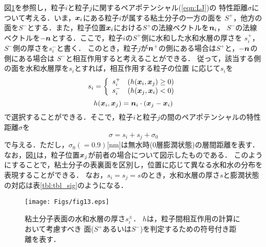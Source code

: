 図\ref{fig:fig13}を参照し，粒子$i$と粒子$j$に関するペアポテンシャル(\ref{eqn:LJ})の
特性距離$\sigma$について考える．いま，$\mbox{\boldmath $x$}_i$にある粒子$i$が属する粘土分子の一方の面を
$S^+$，他方の面を$S^-$とする．また，粒子位置$\mbox{\boldmath $x$}_i$における$S^+$の法線ベクトルを$\mbox{\boldmath $n$}_i$，
$S^-$の法線ベクトルを$-\mbox{\boldmath $n$}$とする．ここで，粒子$i$の$S^+$側に水和した水和水層の厚さを
$s_i^+$，$S^-$側の厚さを$s_i^-$と書く．
このとき，粒子$j$が$\mbox{\boldmath $n$}^+$の側にある場合は$S^+$と，$-\mbox{\boldmath $n$}$の側にある場合は
$S^-$と相互作用すると考えることができる．
従って，該当する側の面を水和水層厚を$s_i$とすれば，相互作用する粒子の位置
に応じて$s_i$を
\begin{equation}
	s_i=\left\{
	\begin{array}{cc}
		s_i^+ & (h(\mbox{\boldmath $x$}_i,\mbox{\boldmath $x$}_j) \ge 0)\\
		s_i^- & (h(\mbox{\boldmath $x$}_j,\mbox{\boldmath $x$}_i) <0)
	\end{array}
	\right.
	\label{eqn:si_switch}
\end{equation}
\begin{equation}
	h(\mbox{\boldmath $x$}_i,\mbox{\boldmath $x$}_j) =\mbox{\boldmath $n$}_i\cdot \left(\mbox{\boldmath $x$}_j-\mbox{\boldmath $x$}_i\right)
	\label{eqn:h_sgn}
\end{equation}
で選択することができる．そこで，粒子$i$と粒子$j$の間のペアポテンシャルの特性距離$\sigma$を
\begin{equation}
	\sigma=s_i+s_j+\sigma_0
	\label{eqn:sig_ij}
\end{equation}
で与える．ただし，$\sigma_0(=0.9)$[nm]は無水時(0層膨潤状態)の層間距離を表す．
なお，図\ref{fig:fig13}は，粒子位置$\mbox{\boldmath $x$}_j$が前者の場合について図示したものである．
このようにすることで，粘土分子の表裏面を区別し，位置に応じて異なる水和水の分布を表現することができる．
なお，$s_i=s_j=s$のとき，水和水層の厚さ$s$と膨潤状態の対応は表\ref{tbl:tbl_sig}のようになる．
\begin{figure}[h]
	\begin{center}
	\texttt{[image: Figs/fig13.eps]} 
	\end{center}
	\caption{
		粘土分子表面の水和水層の厚さ$s_i^\pm $．
		$h$は，粒子間相互作用の計算において考慮すべき
		面($S^+$あるいは$S^-$)を判定するための符号付き距離を表す．
	} 
	\label{fig:fig13}
\end{figure}
